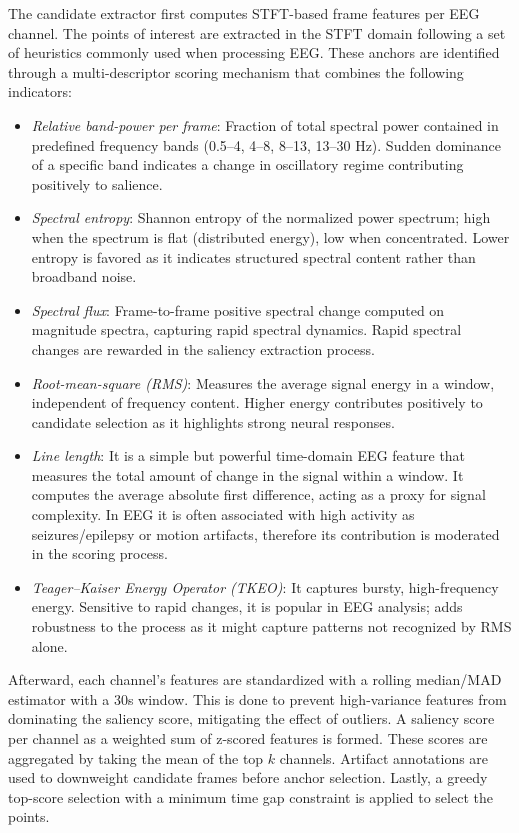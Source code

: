 The candidate extractor first computes STFT-based frame features per EEG channel.
The points of interest are extracted in the STFT domain following a set of heuristics commonly used when processing EEG.
These anchors are identified through a multi-descriptor scoring mechanism that combines the following indicators:
\begin{itemize}
    \item \textit{Relative band-power per frame}: Fraction of total spectral power contained in predefined frequency bands (0.5–4, 4–8, 8–13, 13–30 Hz).
    Sudden dominance of a specific band indicates a change in oscillatory regime contributing positively to salience.

    \item \textit{Spectral entropy}: Shannon entropy of the normalized power spectrum; high when the spectrum is flat (distributed energy), low when concentrated.
    Lower entropy is favored as it indicates structured spectral content rather than broadband noise.

    \item \textit{Spectral flux}: Frame-to-frame positive spectral change computed on magnitude spectra, capturing rapid spectral dynamics.
    Rapid spectral changes are rewarded in the saliency extraction process.

    \item \textit{Root-mean-square (RMS)}: Measures the average signal energy in a window, independent of frequency content.
    Higher energy contributes positively to candidate selection as it highlights strong neural responses.

    \item \textit{Line length}: It is a simple but powerful time-domain EEG feature that measures the total amount of change in the signal within a window.
    It computes the average absolute first difference, acting as a proxy for signal complexity.
    In EEG it is often associated with high activity as seizures/epilepsy or motion artifacts, therefore its contribution is moderated in the scoring process.

    \item \textit{Teager–Kaiser Energy Operator (TKEO)}: It captures bursty, high-frequency energy.
    Sensitive to rapid changes, it is popular in EEG analysis; adds robustness to the process as it might capture patterns not recognized by RMS alone.
\end{itemize}

Afterward, each channel's features are standardized with a rolling median/MAD estimator with a 30s window.
This is done to prevent high-variance features from dominating the saliency score, mitigating the effect of outliers.
A saliency score per channel as a weighted sum of z-scored features is formed.
These scores are aggregated by taking the mean of the top $k$ channels.
Artifact annotations are used to downweight candidate frames before anchor selection.
Lastly, a greedy top-score selection with a minimum time gap constraint is applied to select the points.

